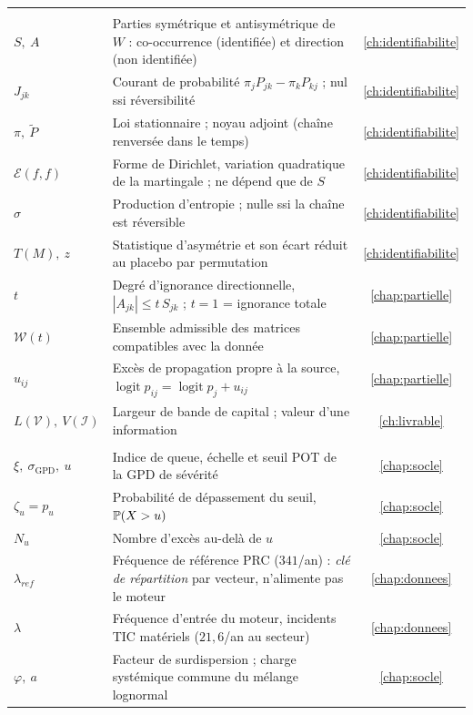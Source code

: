 {\begin{longtable}{>{\raggedright}p{3.3cm} >{\raggedright\arraybackslash}p{10.2cm} c}
\midrule
\multicolumn{3}{@{}l}{\emph{\textcolor{navy}{Identifiabilité et identification partielle}}} \\
$S,\ A$ & Parties symétrique et antisymétrique de $W$ : co-occurrence (identifiée) et direction (non identifiée) & \ref{ch:identifiabilite} \\
$J_{jk}$ & Courant de probabilité $\pi_jP_{jk}-\pi_kP_{kj}$ ; nul ssi réversibilité & \ref{ch:identifiabilite} \\
$\pi,\ \tilde P$ & Loi stationnaire ; noyau adjoint (chaîne renversée dans le temps) & \ref{ch:identifiabilite} \\
$\mathcal{E}(f,f)$ & Forme de Dirichlet, variation quadratique de la martingale ; ne dépend que de $S$ & \ref{ch:identifiabilite} \\
$\sigma$ & Production d'entropie ; nulle ssi la chaîne est réversible & \ref{ch:identifiabilite} \\
$T(M),\ z$ & Statistique d'asymétrie et son écart réduit au placebo par permutation & \ref{ch:identifiabilite} \\
$t$ & Degré d'ignorance directionnelle, $|A_{jk}|\le t\,S_{jk}$ ; $t=1$ = ignorance totale & \ref{chap:partielle} \\
$\mathcal{W}(t)$ & Ensemble admissible des matrices compatibles avec la donnée & \ref{chap:partielle} \\
$u_{ij}$ & Excès de propagation propre à la source, $\operatorname{logit}p_{ij}=\operatorname{logit}p_j+u_{ij}$ & \ref{chap:partielle} \\
$L(\mathcal{V}),\ V(\mathcal{I})$ & Largeur de bande de capital ; valeur d'une information & \ref{ch:livrable} \\
\midrule
\multicolumn{3}{@{}l}{\emph{\textcolor{navy}{Socle : fréquence et sévérité}}} \\
$\xi,\ \sigma_{\text{GPD}},\ u$ & Indice de queue, échelle et seuil POT de la GPD de sévérité & \ref{chap:socle} \\
$\zeta_u=p_u$ & Probabilité de dépassement du seuil, $\mathbb{P}(X>u)$ & \ref{chap:socle} \\
$N_u$ & Nombre d'excès au-delà de $u$ & \ref{chap:socle} \\
$\lambda_{ref}$ & Fréquence de référence PRC ($341$/an) : \emph{clé de répartition} par vecteur, n'alimente pas le moteur & \ref{chap:donnees} \\
$\lambda$ & Fréquence d'entrée du moteur, incidents TIC matériels ($21{,}6$/an au secteur) & \ref{chap:donnees} \\
$\varphi,\ a$ & Facteur de surdispersion ; charge systémique commune du mélange lognormal & \ref{chap:socle} \\

\end{longtable}}
